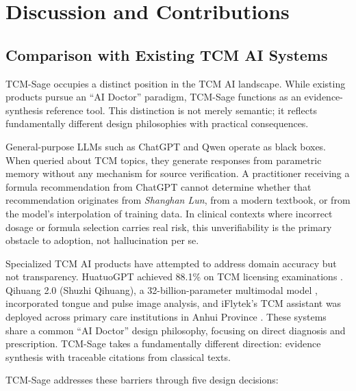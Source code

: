 \chapter{Discussion and Contributions}

\section{Comparison with Existing TCM AI Systems}

TCM-Sage occupies a distinct position in the TCM AI landscape. While existing products pursue an ``AI Doctor'' paradigm, TCM-Sage functions as an evidence-synthesis reference tool. This distinction is not merely semantic; it reflects fundamentally different design philosophies with practical consequences.

General-purpose LLMs such as ChatGPT and Qwen operate as black boxes. When queried about TCM topics, they generate responses from parametric memory without any mechanism for source verification. A practitioner receiving a formula recommendation from ChatGPT cannot determine whether that recommendation originates from \textit{Shanghan Lun}, from a modern textbook, or from the model's interpolation of training data. In clinical contexts where incorrect dosage or formula selection carries real risk, this unverifiability is the primary obstacle to adoption, not hallucination per se.

Specialized TCM AI products have attempted to address domain accuracy but not transparency. HuatuoGPT achieved 88.1\% on TCM licensing examinations \cite{huatuogpt2023}. Qihuang 2.0 (Shuzhi Qihuang), a 32-billion-parameter multimodal model \cite{qihuang2024ecnu}, incorporated tongue and pulse image analysis, and iFlytek's TCM assistant was deployed across primary care institutions in Anhui Province \cite{iflytek2024cnr}. These systems share a common ``AI Doctor'' design philosophy, focusing on direct diagnosis and prescription. TCM-Sage takes a fundamentally different direction: evidence synthesis with traceable citations from classical texts.

TCM-Sage addresses these barriers through five design decisions:

